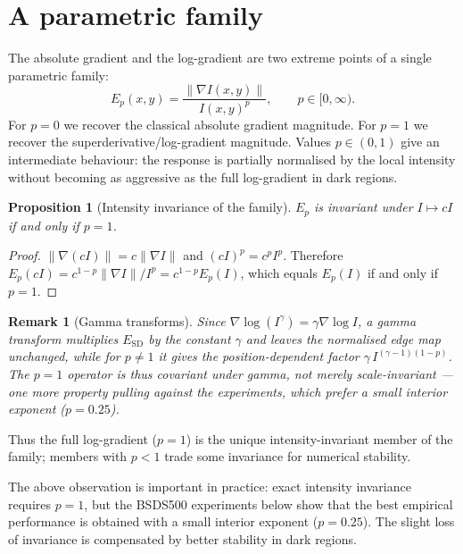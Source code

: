 \documentclass[conference]{IEEEtran}
\newtheorem{proposition}{Proposition}
\newtheorem{remark}{Remark}
\begin{document}
\section{A parametric family}
\label{sec:parametric}
The absolute gradient and the log-gradient are two extreme points of a single
parametric family:
\begin{equation}
E_p(x,y)=\frac{\|\nabla I(x,y)\|}{I(x,y)^p},
\qquad p\in[0,\infty).
\label{eq:parametric}
\end{equation}
For $p=0$ we recover the classical absolute gradient magnitude.  For $p=1$ we
recover the superderivative/log-gradient magnitude.  Values $p\in(0,1)$ give
an intermediate behaviour: the response is partially normalised by the local
intensity without becoming as aggressive as the full log-gradient in dark
regions.

\begin{proposition}[Intensity invariance of the family]
$E_p$ is invariant under $I\mapsto cI$ if and only if $p=1$.
\end{proposition}
\begin{proof}
$\|\nabla(cI)\|=c\|\nabla I\|$ and $(cI)^p=c^p I^p$.  Therefore
$E_p(cI)=c^{1-p}\|\nabla I\|/I^p=c^{1-p}E_p(I)$, which equals $E_p(I)$ if and
only if $p=1$.
\end{proof}

\begin{remark}[Gamma transforms]
\label{rem:gamma}
Since $\nabla\log(I^{\gamma})=\gamma\nabla\log I$, a gamma transform multiplies
$E_{\mathrm{SD}}$ by the constant $\gamma$ and leaves the normalised edge map
unchanged, while for $p\neq1$ it gives the position-dependent factor
$\gamma\,I^{(\gamma-1)(1-p)}$.  The $p=1$ operator is thus covariant under
gamma, not merely scale-invariant --- one more property pulling against the
experiments, which prefer a small interior exponent ($p=0.25$).
\end{remark}

Thus the full log-gradient ($p=1$) is the unique intensity-invariant member of
the family; members with $p<1$ trade some invariance for numerical stability.

The above observation is important in practice: exact intensity invariance
requires $p=1$, but the BSDS500 experiments below show that the best empirical
performance is obtained with a small interior exponent ($p=0.25$).
The slight loss of invariance is compensated by better stability in dark regions.
\end{document}
